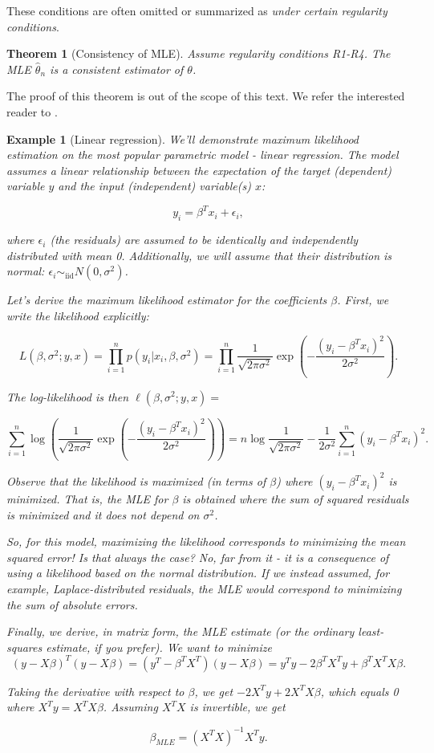 \documentclass{book}
\theoremstyle{plain}%
\newtheorem{prototheorem}{Example}[section]
\newenvironment{cexample}
   {\colorlet{shadecolor}{gray!10}\begin{shaded}\begin{prototheorem}}
   {\end{prototheorem}\end{shaded}}
\newtheorem{theorem}{Theorem}[section]
\theoremstyle{definition}
\begin{document}
These conditions are often omitted or summarized as \emph{under certain regularity conditions}.

\begin{theorem}[Consistency of MLE] Assume regularity conditions R1-R4. The MLE $\hat{\theta}_n$ is a consistent estimator of $\theta$.
\end{theorem}

The proof of this theorem is out of the scope of this text. We refer the interested reader to \citet[ch. 6.]{Hogg2005}.

\begin{cexample}[Linear regression] We'll demonstrate maximum likelihood estimation on the most popular parametric model - linear regression. The model assumes a linear relationship between the expectation of the target (dependent) variable $y$ and the input (independent) variable(s) $x$:

$$y_i = \beta^T x_i + \epsilon_i,$$

where $\epsilon_i$ (the residuals) are assumed to be identically and independently distributed with mean 0. Additionally, we will assume that their distribution is normal: $\epsilon_i \sim_\text{iid} N(0, \sigma^2)$.

Let's derive the maximum likelihood estimator for the coefficients $\beta$. First, we write the likelihood explicitly:

$$L(\beta, \sigma^2; y, x) = \prod_{i=1}^n p(y_i|x_i,\beta,\sigma^2) = \prod_{i=1}^n \frac{1}{\sqrt{2\pi\sigma^2}}\exp(-\frac{(y_i - \beta^Tx_i)^2}{2\sigma^2}).$$

The log-likelihood is then $\ell(\beta, \sigma^2; y, x) =$

$$\sum_{i=1}^n \log{\left(\frac{1}{\sqrt{2\pi\sigma^2}}\exp(-\frac{(y_i - \beta^Tx_i)^2}{2\sigma^2})\right)} = n\log\frac{1}{\sqrt{2\pi\sigma^2}} - \frac{1}{2\sigma^2}\sum_{i=1}^n (y_i - \beta^Tx_i)^2.$$

Observe that the likelihood is maximized (in terms of $\beta$) where $(y_i - \beta^Tx_i)^2$ is minimized. That is, the MLE for $\beta$ is obtained where the sum of squared residuals is minimized and it does not depend on $\sigma^2$.

So, for this model, maximizing the likelihood corresponds to minimizing the mean squared error! Is that always the case? No, far from it - it is a consequence of using a likelihood based on the normal distribution. If we instead assumed, for example, Laplace-distributed residuals, the MLE would correspond to minimizing the sum of absolute errors.

Finally, we derive, in matrix form, the MLE estimate (or the ordinary least-squares estimate, if you prefer). We want to minimize $$(y - X\beta)^T(y -  X\beta) = (y^T - \beta^TX^T)(y -  X\beta) = y^Ty - 2\beta^TX^Ty+ \beta^TX^TX\beta .$$

Taking the derivative with respect to $\beta$, we get $- 2X^Ty+ 2X^TX\beta$, which equals 0 where  $X^Ty = X^TX\beta$. Assuming $X^TX$ is invertible, we get

$$\beta_{MLE}=(X^TX)^{-1}X^Ty.$$
\end{cexample}
\end{document}
